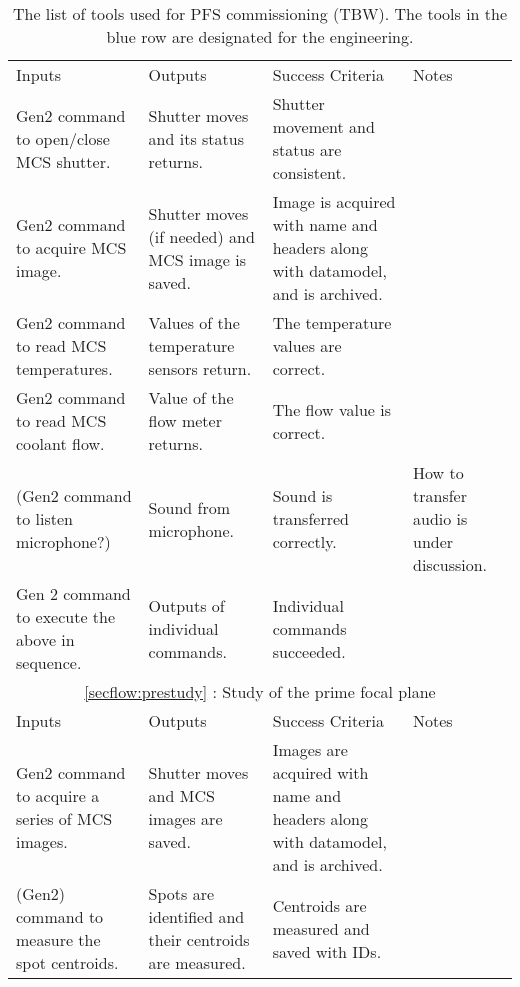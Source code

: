 \begin{longtable}{p{40mm}|p{40mm}|p{40mm}|p{35mm}}
\caption{
The list of tools used for PFS commissioning (TBW). The tools in the blue row are designated for the engineering.}
\label{tbl:tools} 
\footnotesize
\endhead
\endfoot
\hline
\multicolumn{4}{c}{ \ref{secflow:MCSoff} and \ref{secflow:MCSon}: Initial check of MCS} \\ \hline
Inputs	& Outputs & Success Criteria & Notes \\ \arrayrulecolor[rgb]{0.63,0.79,0.95}\hline \hline \arrayrulecolor{black}
Gen2 command to open/close MCS shutter. 	&  Shutter moves and its status returns.	& Shutter movement and status are consistent.	&  	\\  \hline
Gen2 command to acquire MCS image. 	&  Shutter moves (if needed) and MCS image is saved.	& Image is acquired with name and headers along with datamodel, and is archived. &  \\  \hline
Gen2 command to read MCS temperatures. 	&  Values of the temperature sensors return. 	& The temperature values are correct.	&  \\  \hline
Gen2 command to read MCS coolant flow. 	&  Value of the flow meter returns.	& The flow value is correct.	&  \\  \hline
(Gen2 command to listen microphone?) 	&  Sound from microphone.	& Sound is transferred correctly.	& How to transfer audio is under discussion.  \\  \hline
Gen 2 command to execute the above in sequence. 	&  Outputs of individual commands.	& Individual commands succeeded.	&  	\\ \hline \hline
\multicolumn{4}{c}{ \ref{secflow:prestudy} : Study of the prime focal plane } \\ \hline
Inputs	& Outputs & Success Criteria & Notes \\ \arrayrulecolor[rgb]{0.63,0.79,0.95}\hline \hline \arrayrulecolor{black}
Gen2 command to acquire a series of MCS images. 	&  Shutter moves and MCS images are saved.	& Images are acquired with name and headers along with datamodel, and is archived. &  \\  \hline
(Gen2) command to measure the spot centroids. 	&  Spots are identified and their centroids are measured.	& Centroids are measured and saved with IDs. &  \\  \hline

\end{longtable}
